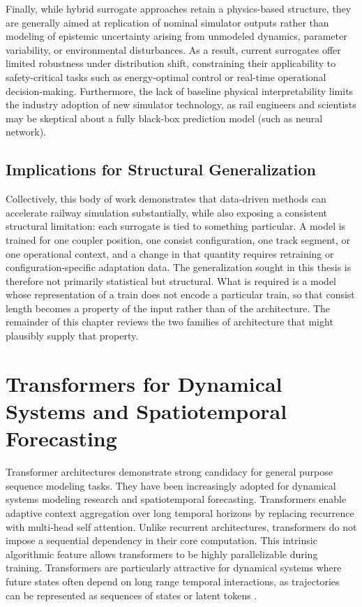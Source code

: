 Finally, while hybrid surrogate approaches retain a physics-based structure, they are generally aimed at replication of nominal simulator outputs rather than modeling of epistemic uncertainty arising from unmodeled dynamics, parameter variability, or environmental disturbances. As a result, current surrogates offer limited robustness under distribution shift, constraining their applicability to safety-critical tasks such as energy-optimal control or real-time operational decision-making. Furthermore, the lack of baseline physical interpretability limits the industry adoption of new simulator technology, as rail engineers and scientists may be skeptical about a fully black-box prediction model (such as neural network).

\subsection{Implications for Structural Generalization}

Collectively, this body of work demonstrates that data-driven methods can accelerate railway simulation substantially, while also exposing a consistent structural limitation: each surrogate is tied to something particular. A model is trained for one coupler position, one consist configuration, one track segment, or one operational context, and a change in that quantity requires retraining or configuration-specific adaptation data. The generalization sought in this thesis is therefore not primarily statistical but structural. What is required is a model whose representation of a train does not encode a particular train, so that consist length becomes a property of the input rather than of the architecture. The remainder of this chapter reviews the two families of architecture that might plausibly supply that property.


\section{Transformers for Dynamical Systems and Spatiotemporal Forecasting}

Transformer architectures demonstrate strong candidacy for general purpose sequence modeling tasks. They have been increasingly adopted for dynamical systems modeling research and spatiotemporal forecasting. Transformers enable adaptive context aggregation over long temporal horizons by replacing recurrence with multi-head self attention. Unlike recurrent architectures, transformers do not impose a sequential dependency in their core computation. This intrinsic algorithmic feature allows transformers to be highly parallelizable during training. Transformers are particularly attractive for dynamical systems where future states often depend on long range temporal interactions, as trajectories can be represented as sequences of states or latent tokens \cite{vaswani2017attention}.

